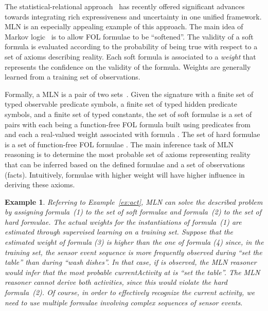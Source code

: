 \documentclass[10pt, conference, compsocconf]{IEEEtran}
\newtheorem{example}{Example}
\begin{document}
The statistical-relational approach~\cite{Getoor2007} has recently offered significant advances towards integrating rich expressiveness and uncertainty in one unified framework. MLN is an especially appealing example of this approach. 
The main idea of Markov logic~\cite{Domingos2004} is to allow FOL formulae to be ``softened''.
The validity of a soft formula is evaluated according to the probability of being true with 
respect to a set of axioms describing reality. 
Each soft formula is associated to a \emph{weight} that represents the confidence on 
the validity of the formula.
Weights are generally learned from a training set of
observations.

Formally, a MLN is a pair of two sets~. Given the signature  with  a finite set of typed observable predicate symbols,  a finite set of typed hidden predicate symbols, and  a finite set of typed constants, the set of soft formulae  is a set of  pairs  with each  being a function-free FOL formula built using predicates from  and each  a real-valued weight associated with formula . The set of hard formulae  is a set of  function-free FOL formulae . 
The main inference task of MLN reasoning is to determine the most probable set
of axioms representing reality that can be inferred based 
on the defined formulae and a set of observations (facts).
Intuitively, formulae with higher weight will have higher influence in 
deriving these axioms. 


\begin{example}
Referring to Example~\ref{ex:act}, MLN can solve the described problem by assigning 
formula~(1) to the set of soft formulae and formula~(2) to the set of hard formulae. 
The actual weights for the instantiations of formula~(1) are estimated through supervised learning on a training set. 
Suppose that the estimated weight of formula (3) is higher than the one of 
formula (4) since, in the training set, the sensor event sequence   
is more frequently observed during ``set the table'' than during ``wash dishes''. 
In that case, if  is observed, the MLN reasoner would infer that the most 
probable \emph{currentActivity} at  is ``set the table''. 
The MLN reasoner cannot derive both activities, since this would violate the hard 
formula~(2). 
Of course, in order to effectively recognize the current activity, we need to use 
multiple formulae involving complex sequences of sensor events.
\end{example}
\end{document}
